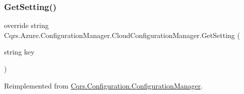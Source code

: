 \subsubsection{\texorpdfstring{Get\+Setting()}{GetSetting()}}
{\footnotesize\ttfamily override string Cqrs.\+Azure.\+Configuration\+Manager.\+Cloud\+Configuration\+Manager.\+Get\+Setting (\begin{DoxyParamCaption}\item[{string}]{key }\end{DoxyParamCaption})\hspace{0.3cm}{\ttfamily [virtual]}}



Reimplemented from \hyperlink{classCqrs_1_1Configuration_1_1ConfigurationManager_ac3e31af665b95b781fee23f577170a63}{Cqrs.\+Configuration.\+Configuration\+Manager}.

